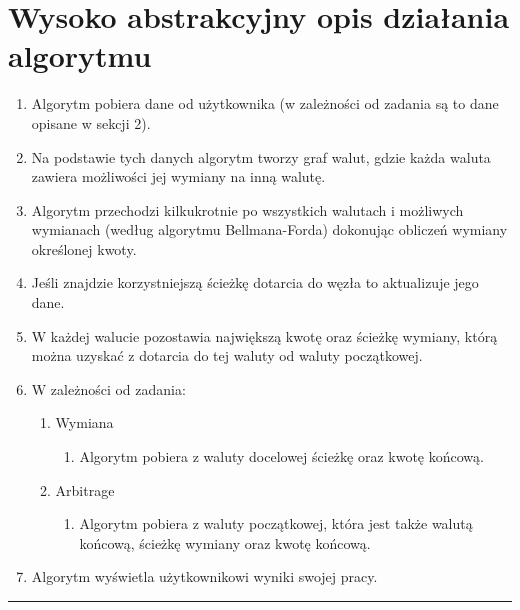 \documentclass[a4paper,11pt]{article}
\newcommand{\linia}{\rule{\linewidth}{0.4mm}}
\begin{document}
\section{Wysoko abstrakcyjny opis działania algorytmu}
\begin{enumerate}
\item Algorytm pobiera dane od użytkownika (w zależności od zadania są to dane opisane w sekcji 2).
\item Na podstawie tych danych algorytm tworzy graf walut, gdzie każda waluta zawiera możliwości jej wymiany na inną walutę.
\item Algorytm przechodzi kilkukrotnie po wszystkich walutach i możliwych wymianach (według algorytmu Bellmana-Forda) dokonując obliczeń wymiany określonej kwoty.
\item Jeśli znajdzie korzystniejszą ścieżkę dotarcia do węzła to aktualizuje jego dane.
\item W każdej walucie pozostawia największą kwotę oraz ścieżkę wymiany, którą można uzyskać z dotarcia do tej waluty od waluty początkowej.
\item W zależności od zadania:
\begin{enumerate}
\item Wymiana
\begin{enumerate}
\item Algorytm pobiera z waluty docelowej ścieżkę oraz kwotę końcową.
\end{enumerate}
\item Arbitrage
\begin{enumerate}
\item Algorytm pobiera z waluty początkowej, która jest także walutą końcową, ścieżkę wymiany oraz kwotę końcową.
\end{enumerate}
\end{enumerate}
\item Algorytm wyświetla użytkownikowi wyniki swojej pracy.
\end{enumerate}
\noindent\linia
\end{document}

